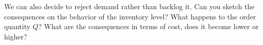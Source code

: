 \begin{exercise}We can also decide to reject demand rather than
  backlog it. Can you sketch the consequences on the behavior of the
  inventory level?  What happens to the order quantity $Q$?  What are
  the consequences in terms of cost, does it become lower or higher?
  \begin{comment}
    The influence on the cost is qualitatively easy. Once again we
    relax a constraint, hence it must be possible to reduce the
    average cost. Again, we are trying to find out by how much. 

    \begin{remark}
      I added this remark as a postscript to the analysis below. The
      solution here is quite messy because, while solving it, I made a
      few mistakes and conceptual errors. Despite this, I decided to
      keep the mistakes in with the aim to show you what went wrong,
      how I saw that things were wrong, and my attempts to repair
      it. The take-away message is that you see that making mistakes
      is part of the learning process\ldots for all of us\ldots
    \end{remark}

    Let's assume we order every $T$ periods.

\begin{center}
\begin{tikzpicture}[x=1cm,y=0.01cm]
\small

\draw[thick,->] (0,0) -- (8.5,0) node[right] {Time};
\draw[thick,->] (0,-150) -- (0,300) node[above] {Inventory};

\draw[] (0,200) node[left] {$Q$};



\draw[dashed] (0,150) -- (0.5,150) -- (0.5,0);


\draw[] (2,0) node[below] {$Q/D$};
\draw[] (3,0) node[below] {$T$};

\draw[] (5,0) node[below] {$T+Q/D$};
\draw[] (6,0) node[below] {$2T$};

\draw [draw=blue,fill=blue,fill opacity=0.2] (0,0) -- (0,200) -- (2,0) -- cycle;
\draw [draw=blue,fill=blue,fill opacity=0.2] (3,0) -- (3,200) -- (5,0) -- cycle;
\draw [draw=blue,fill=blue,fill opacity=0.2] (6,0) -- (6,200) -- (8,0) -- cycle;


\end{comment}
\end{exercise}
